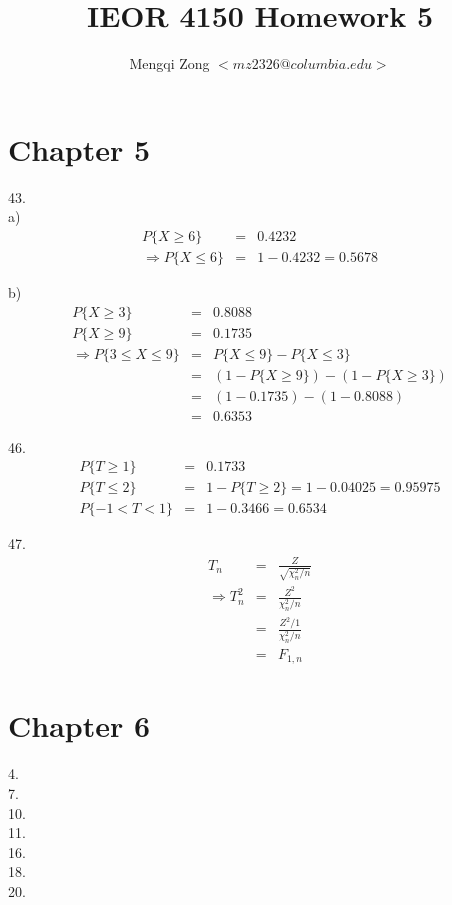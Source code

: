 \documentclass[12pt]{article}
\title{IEOR 4150 Homework 5}
\author{Mengqi Zong $<mz2326@columbia.edu>$}
\begin{document}
\maketitle

\setlength{\parindent}{0in}

\section*{Chapter 5}

43. \\

a)
\begin{eqnarray*}
  P \{ X \ge 6 \} &=& 0.4232 \\
  \Rightarrow P \{ X \le 6 \} &=& 1 - 0.4232 = 0.5678
\end{eqnarray*}

b)
\begin{eqnarray*}
  P \{ X \ge 3 \} &=& 0.8088 \\
  P \{ X \ge 9 \} &=& 0.1735 \\
  \Rightarrow   P \{ 3 \le X \le 9 \}
  &=& P \{ X \le 9 \} - P \{ X \le 3 \} \\
  &=& (1 - P \{ X \ge 9 \}) - (1 - P \{ X \ge 3 \}) \\
  &=& (1 - 0.1735) - (1 - 0.8088) \\
  &=& 0.6353
\end{eqnarray*}

46.
\begin{eqnarray*}
  P \{ T \ge 1 \} &=& 0.1733 \\
  P \{ T \le 2 \} &=& 1 - P \{ T \ge 2 \} = 1 - 0.04025 = 0.95975 \\
  P \{ -1 < T < 1 \} &=& 1 - 0.3466 = 0.6534
\end{eqnarray*}

47.
\begin{eqnarray*}
  T_n &=& \frac {Z}{\sqrt{\chi_n^2 / n}} \\
  \Rightarrow T_n^2 &=& \frac {Z^2}{\chi_n^2 / n} \\
  &=& \frac {Z^2 / 1}{\chi_n^2 / n} \\
  &=& F_{1,n}
\end{eqnarray*}

\section*{Chapter 6}

4. \\

7. \\

10. \\

11. \\

16. \\

18. \\

20. \\
\end{document}
